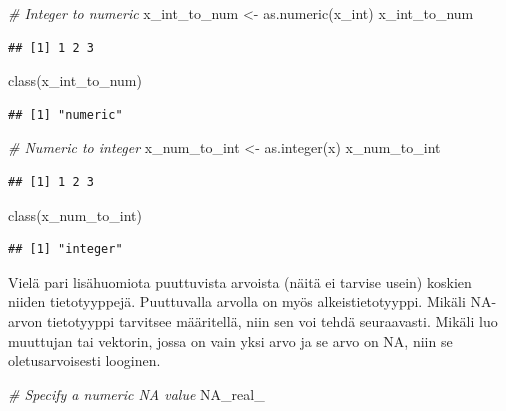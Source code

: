\documentclass[
]{book}
\newenvironment{Shaded}{\begin{snugshade}}{\end{snugshade}}
\newcommand{\CommentTok}[1]{\textcolor[rgb]{0.56,0.35,0.01}{\textit{#1}}}
\newcommand{\ConstantTok}[1]{\textcolor[rgb]{0.00,0.00,0.00}{#1}}
\newcommand{\FunctionTok}[1]{\textcolor[rgb]{0.00,0.00,0.00}{#1}}
\newcommand{\NormalTok}[1]{#1}
\newcommand{\OtherTok}[1]{\textcolor[rgb]{0.56,0.35,0.01}{#1}}
\begin{document}
\begin{Shaded}
\begin{Highlighting}[]
\CommentTok{\# Integer to numeric}
\NormalTok{x\_int\_to\_num }\OtherTok{\textless{}{-}} \FunctionTok{as.numeric}\NormalTok{(x\_int)}
\NormalTok{x\_int\_to\_num}
\end{Highlighting}
\end{Shaded}

\begin{verbatim}
## [1] 1 2 3
\end{verbatim}

\begin{Shaded}
\begin{Highlighting}[]
\FunctionTok{class}\NormalTok{(x\_int\_to\_num)}
\end{Highlighting}
\end{Shaded}

\begin{verbatim}
## [1] "numeric"
\end{verbatim}

\begin{Shaded}
\begin{Highlighting}[]
\CommentTok{\# Numeric to integer}
\NormalTok{x\_num\_to\_int }\OtherTok{\textless{}{-}} \FunctionTok{as.integer}\NormalTok{(x)}
\NormalTok{x\_num\_to\_int}
\end{Highlighting}
\end{Shaded}

\begin{verbatim}
## [1] 1 2 3
\end{verbatim}

\begin{Shaded}
\begin{Highlighting}[]
\FunctionTok{class}\NormalTok{(x\_num\_to\_int)}
\end{Highlighting}
\end{Shaded}

\begin{verbatim}
## [1] "integer"
\end{verbatim}

Vielä pari lisähuomiota puuttuvista arvoista (näitä ei tarvise usein) koskien niiden tietotyyppejä. Puuttuvalla arvolla on myös alkeistietotyyppi. Mikäli NA-arvon tietotyyppi tarvitsee määritellä, niin sen voi tehdä seuraavasti. Mikäli luo muuttujan tai vektorin, jossa on vain yksi arvo ja se arvo on NA, niin se oletusarvoisesti looginen.

\begin{Shaded}
\begin{Highlighting}[]
\CommentTok{\# Specify a numeric NA value}
\ConstantTok{NA\_real\_}
\end{Highlighting}
\end{Shaded}
\end{document}
